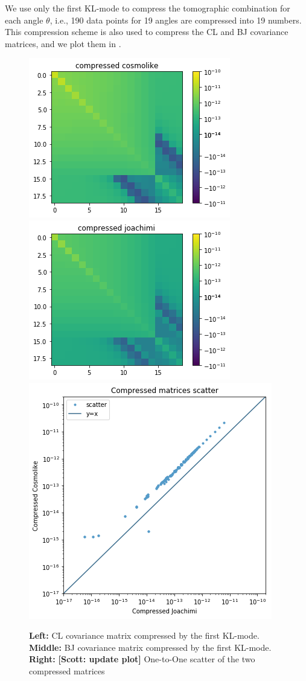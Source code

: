 \documentclass[twocolumn]{\docclass}
\newcommand\scott[1]{{\bf [Scott: #1]}}
\begin{document}
	We use only the first KL-mode to compress the tomographic combination for each angle $\theta$, i.e., 190 data points for 19 angles are compressed into 19 numbers.  This compression scheme is also used to compress the CL and BJ covariance matrices, and we plot them in .
	
	\begin{figure}
		\includegraphics[width=0.68\columnwidth]{kl_comp_cl.png}
		\includegraphics[width=0.68\columnwidth]{kl_comp_bj.png}
		\includegraphics[width=0.54\columnwidth]{kl_scatter.png}
		\caption{\textbf{Left:} CL covariance matrix compressed by the first KL-mode. \textbf{Middle:} BJ covariance matrix compressed by the first KL-mode. \textbf{Right:} \scott{update plot} One-to-One scatter of the two compressed matrices \label{fig:comp-cov}}
	\end{figure}
	
\end{document}
